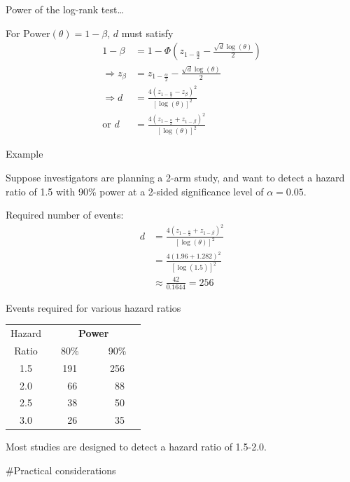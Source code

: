 \documentclass[ignorenonframetext,]{beamer}
\begin{document}
\begin{frame}{%
\protect\hypertarget{power-of-the-log-rank-test-1}{%
Power of the log-rank test\ldots}}

For \(\text{Power}(\theta) = 1-\beta\), \(d\) must satisfy
\begin{align*}
1 - \beta &= 
1 - \Phi \left(z_{1- \frac{\alpha}{2}} - \frac{\sqrt{d} \log(\theta)}{2}\right)\\[1ex]
\Rightarrow  z_{\beta} &=  
z_{1- \frac{\alpha}{2}} - \frac{\sqrt{d} \log(\theta)}{2}\\[1ex]
\Rightarrow  d  &=  
\frac{4 \left(z_{1- \frac{\alpha}{2}} - z_{\beta}\right)^2}
{[\log(\theta)]^2}\\[1ex]
\text{or } d &=  
\frac{4 \left(z_{1- \frac{\alpha}{2}} + z_{1-\beta}\right)^2}{[\log(\theta)]^2} 
\end{align*}

\end{frame}

\begin{frame}{%
\protect\hypertarget{example}{%
Example}}

Suppose investigators are planning a 2-arm study, and want to detect a
hazard ratio of 1.5 with 90\% power at a 2-sided significance level of
\(\alpha=0.05\).

Required number of events: \begin{align*}
d &= \frac{4 \left(z_{1- \frac{\alpha}{2}} + z_{1-\beta}\right)^2}
{[\log(\theta)]^2}\\[1ex]
&= \frac{4 (1.96 + 1.282)^2}{[\log(1.5)]^2}\\[1ex]
&\approx \frac{42}{0.1644} = 256
\end{align*}

\end{frame}

\begin{frame}{%
\protect\hypertarget{events-required-for-various-hazard-ratios}{%
Events required for various hazard ratios}}

\begin{center}
\begin{tabular}{ccc}
Hazard & \multicolumn{2}{c}{\bf Power} \\ \cline{2-3}
Ratio & ~~80\%~~ & ~~90\%~~ \\ \hline
1.5 & 191 & 256 \\
2.0 & ~66 & ~88 \\
2.5 & ~38 & ~50 \\
3.0 & ~26 & ~35 \\
\hline
\end{tabular}
\end{center}

Most studies are designed to detect a hazard ratio of 1.5-2.0.

\#Practical considerations

\end{frame}
\end{document}
